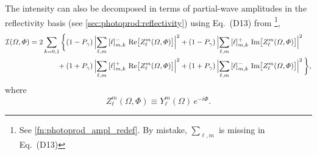 The intensity can also be decomposed in terms of partial-wave
amplitudes in the reflectivity basis (see
\cref{sec:photoprod:reflectivity}) using Eq.~(D13) from
\footnote{See \cref{fn:photoprod_ampl_redef}.
By mistake, $\sum_{\ell, m}$ is missing in Eq.~(D13)}, \ie
\begin{equation}
  \label{eq:zlm_photoprod}
  \begin{aligned}
  \mathcal{I}(\Omega, \Phi)
  = 2 \sum_{k = 0, 1} \bigg\{
         &(1 - P_\gamma)\, \Abs[2]{\sum_{\ell, m}\, [\ell]_{m, k}^{-}\, \Re[1]{Z_\ell^m(\Omega, \Phi)}}^2
      +   (1 - P_\gamma)\, \Abs[2]{\sum_{\ell, m}\, [\ell]_{m, k}^{+}\, \Im[1]{Z_\ell^m(\Omega, \Phi)}}^2
    \\
    {}+{}&(1 + P_\gamma)\, \Abs[2]{\sum_{\ell, m}\, [\ell]_{m, k}^{+}\, \Re[1]{Z_\ell^m(\Omega, \Phi)}}^2
      +   (1 + P_\gamma)\, \Abs[2]{\sum_{\ell, m}\, [\ell]_{m, k}^{-}\, \Im[1]{Z_\ell^m(\Omega, \Phi)}}^2
    \bigg\},
  \end{aligned}
\end{equation}
where
\begin{equation}
  Z_\ell^m(\Omega, \Phi)
  \equiv Y_\ell^m(\Omega)\, e^{-i \Phi}.
\end{equation}

